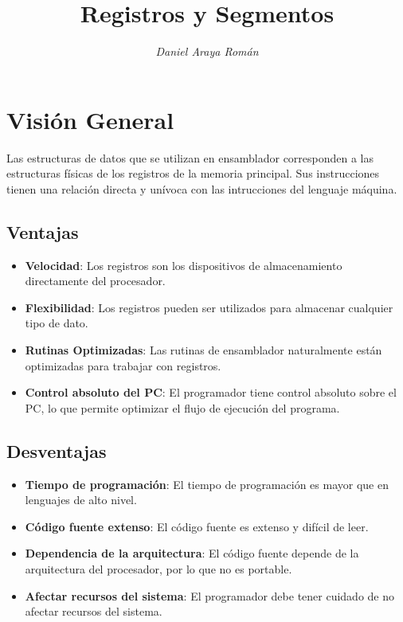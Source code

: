 \documentclass{article}
\title{\LARGE\textbf{Registros y Segmentos}}
\author{\large\textit{Daniel Araya Román}}
\date{}
\begin{document}
\maketitle

\section*{Visi\'{o}n General}
Las estructuras de datos que se utilizan en ensamblador
corresponden a las estructuras f\'{i}sicas de los registros
de la memoria principal. Sus instrucciones tienen una relaci\'{o}n
directa y un\'{i}voca con las intrucciones del lenguaje m\'{a}quina.
\medbreak

\begin{multicols}{2}
    \subsection*{\hspace*{1cm} Ventajas}
    \begin{itemize}
        \item \textbf{Velocidad}: Los registros son los dispositivos
              de almacenamiento directamente del procesador.

        \item \textbf{Flexibilidad}: Los registros pueden ser utilizados
              para almacenar cualquier tipo de dato.

        \item \textbf{Rutinas Optimizadas}: Las rutinas de ensamblador
              naturalmente est\'{a}n optimizadas para trabajar con registros.

        \item \textbf{Control absoluto del PC}: El programador tiene
              control absoluto sobre el PC, lo que permite optimizar el
              flujo de ejecuci\'{o}n del programa.
    \end{itemize}
    \columnbreak

    \subsection*{\hspace*{1cm} Desventajas}
    \begin{itemize}
        \item \textbf{Tiempo de programaci\'{o}n}: El tiempo de programaci\'{o}n
              es mayor que en lenguajes de alto nivel.

        \item \textbf{C\'{o}digo fuente extenso}: El c\'{o}digo fuente es
              extenso y dif\'{i}cil de leer.

        \item \textbf{Dependencia de la arquitectura}: El c\'{o}digo fuente
              depende de la arquitectura del procesador, por lo que no es
              portable.

        \item \textbf{Afectar recursos del sistema}: El programador debe
              tener cuidado de no afectar recursos del sistema.
    \end{itemize}
\end{multicols}
\end{document}
